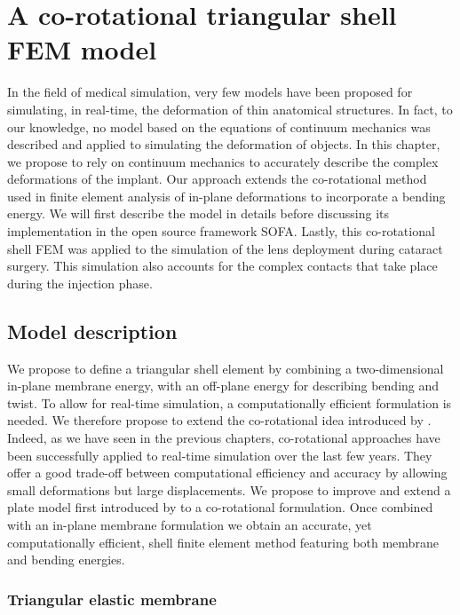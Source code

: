 \chapter{A co-rotational triangular shell FEM model}
\label{chap9}
\begin{shortAbstract}
In the field of medical simulation, very few models have been proposed for simulating, in real-time, the deformation of thin anatomical structures. In fact, to our knowledge, no model based on the equations of continuum mechanics was described and applied to simulating the deformation of objects. In this chapter, we propose to rely on continuum mechanics to accurately describe the complex deformations of the implant. Our approach extends the co-rotational method used in finite element analysis of in-plane deformations to incorporate a bending energy. We will first describe the model in details before discussing its implementation in the open source framework SOFA. Lastly, this co-rotational shell FEM was applied to the simulation of the lens deployment during cataract surgery. This simulation also accounts for the complex contacts that take place during the injection phase.
\end{shortAbstract}


\section{Model description}

We propose to define a triangular shell element by combining a two-dimensional in-plane membrane energy, with an off-plane energy for describing bending and twist. To allow for real-time simulation, a computationally efficient formulation is needed. We therefore propose to extend the co-rotational idea introduced by \cite{Felippa00}. Indeed, as we have seen in the previous chapters, co-rotational approaches have been successfully applied to real-time simulation over the last few years. They offer a good trade-off between computational efficiency and accuracy by allowing small deformations but large displacements. We propose to improve and extend a plate model first introduced by \cite{Przemieniecki85} to a co-rotational formulation. Once combined with an in-plane membrane formulation we obtain an accurate, yet computationally efficient, shell finite element method featuring both membrane and bending energies. 

\subsection{Triangular elastic membrane}

